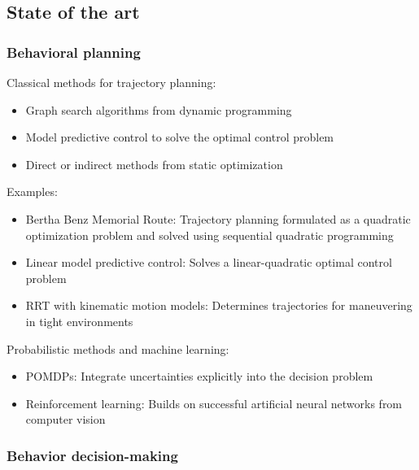 \subsection{State of the art}

\subsubsection*{Behavioral planning}

Classical methods for trajectory planning:
\begin{itemize}
    \item Graph search algorithms from dynamic programming
    \item Model predictive control to solve the optimal control problem
    \item Direct or indirect methods from static optimization
\end{itemize}

Examples:
\begin{itemize}
    \item Bertha Benz Memorial Route: Trajectory planning formulated as a quadratic optimization problem and solved using sequential quadratic programming \cite{ziegler_trajectory_2014}
    \item Linear model predictive control: Solves a linear-quadratic optimal control problem \cite{gutjahr_lateral_2017}
    \item RRT with kinematic motion models: Determines trajectories for maneuvering in tight environments \cite{banzhaf_footprints_2018}
\end{itemize}

Probabilistic methods and machine learning:
\begin{itemize}
    \item POMDPs: Integrate uncertainties explicitly into the decision problem \cite{hubmann_automated_2018}
    \item Reinforcement learning: Builds on successful artificial neural networks from computer vision \cite{chen_model-free_2019}
\end{itemize}

\subsubsection*{Behavior decision-making}

